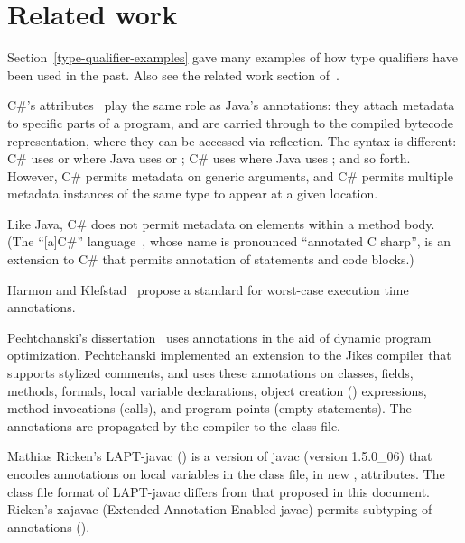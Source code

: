 \documentclass[10pt]{article}
\begin{document}
\section{Related work\label{related-work}}

Section~\ref{type-qualifier-examples} gave many examples of how type
qualifiers have been used in the past.  Also see the related work section
of~\cite{PapiACPE2008}.

C\#'s attributes~\cite[chap.~24]{ECMA334-4th} play the same role as Java's
annotations:  they attach metadata to specific parts of a program, and are
carried through to the compiled bytecode representation, where they can be
accessed via reflection.  The syntax is different:  C\# uses
\code{[AnnotationName]} or  where Java uses
 or
; C\# uses  where
Java uses ; and so forth.
However, C\# permits metadata
on generic arguments, and C\# permits multiple metadata instances of the
same type to appear at a given location.


Like Java, C\# does not permit
metadata on elements within a method body.
(The ``[a]C\#'' language~\cite{CazzolaCC2005:JOT}, whose name is pronounced
``annotated C sharp'', is an extension to C\# that permits annotation of
statements and code blocks.)

Harmon and Klefstad~\cite{HarmonK2007} propose a standard for worst-case
execution time annotations.


Pechtchanski's dissertation~\cite{Pechtchanski2003} uses annotations in the
aid of dynamic program optimization.  Pechtchanski implemented an extension
to the Jikes compiler that supports stylized comments, and uses these
annotations on classes, fields, methods, formals, local variable
declarations, object creation () expressions, method invocations
(calls), and program points (empty statements).  The annotations are
propagated by the compiler to the class file.


Mathias Ricken's LAPT-javac
() is a version
of javac (version 1.5.0\_06) that
encodes annotations on local variables in the class file, in new
, attributes.
The class file format of LAPT-javac differs from that proposed in this
document.
Ricken's xajavac (Extended Annotation Enabled
javac) permits subtyping of annotations ().
\end{document}

